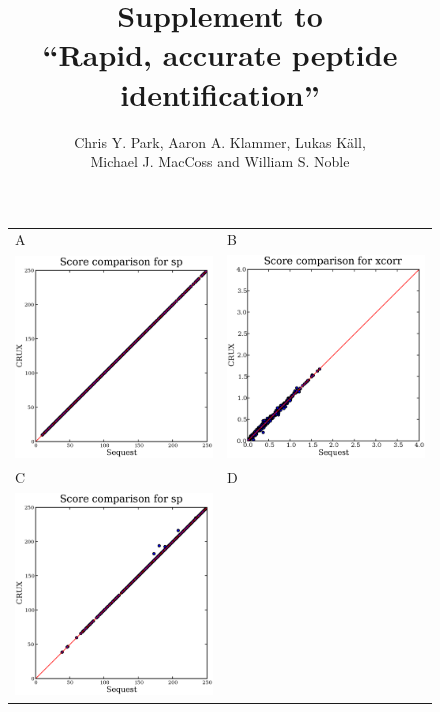 \documentclass{article}
\begin{document}
\title{Supplement to \\``Rapid, accurate peptide identification''}

\author{Chris Y. Park, Aaron A. Klammer, Lukas K\"{a}ll, \\
Michael J. MacCoss and William S. Noble}

\maketitle

\begin{figure}
  \centering
  \begin{tabular}{ll}
    {\sf A} & {\sf B} \\
    \includegraphics[width=2.5in]{../../results/paper-figure/second-score/4800/fig-2-random-sp.eps} &
    \includegraphics[width=2.5in]{../../results/paper-figure/second-score/4800/fig-2-random-xcorr.eps} \\
    {\sf C} & {\sf D} \\
    \includegraphics[width=2.5in]{../../results/paper-figure/second-score/QSTAR/fig-2-random-sp.eps} &

\end{tabular}
\end{figure}
\end{document}
